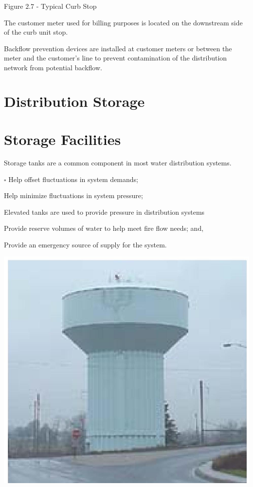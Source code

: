 \documentclass[10pt]{article}
\begin{document}
Figure $2.7$ - Typical Curb Stop

The customer meter used for billing purposes is located on the downstream side of the curb unit stop.

Backflow prevention devices are installed at customer meters or between the meter and the customer's line to prevent contamination of the distribution network from potential backflow.

\section{Distribution Storage}
\section{Storage Facilities}
Storage tanks are a common component in most water distribution systems.

$\square$ Help offset fluctuations in system demands;

Help minimize fluctuations in system pressure;

Elevated tanks are used to provide pressure in distribution systems

Provide reserve volumes of water to help meet fire flow needs; and,

Provide an emergency source of supply for the system.

\includegraphics[max width=\textwidth]{2022_10_30_098bb5f44c5986ff92a9g-18}
\end{document}
